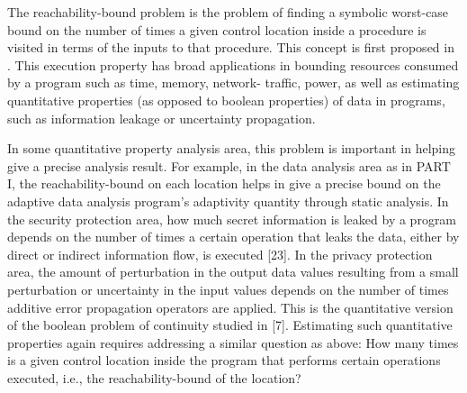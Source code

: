 The reachability-bound problem is
the problem of finding a symbolic worst-case bound on the number of times a given control location 
inside a procedure is visited in terms of the inputs to that procedure.
This concept is first proposed in \cite{GulwaniZ10}.
This execution property has broad
applications in bounding resources consumed by a program such as time, memory,
network- traffic, power, as well as estimating quantitative properties (as opposed to boolean properties)
of data in programs, such as information leakage or uncertainty propagation.

In some quantitative property analysis area, this problem is important in helping give a precise analysis result.
For example, in the data analysis area as in PART I, the reachability-bound on each location helps
in give a precise bound on the adaptive data analysis program's adaptivity quantity through static analysis.
In the security protection area,
how much secret information is leaked by a program depends on the number of times a certain operation that leaks the data,
either by direct or indirect information flow, is executed [23].
In the privacy protection area, the amount of perturbation in the output data values resulting
from a small perturbation or uncertainty in the input values depends on the number of times additive error propagation operators are applied.
This is the quantitative version of the boolean problem of continuity studied in [7]. 
Estimating such quantitative properties again requires addressing a similar question as above:
How many times is a given control location inside the program that performs certain operations executed,
i.e., the
reachability-bound of the location?

